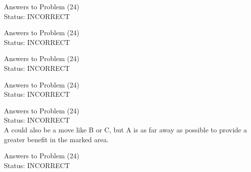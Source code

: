 \documentclass[11pt]{article}
\begin{document}
\begin{minipage}[t]{0.5\textwidth}
  {\centering
  
  Answers to Problem (24)\\
  Status: INCORRECT\\
  
  }
\end{minipage}
\begin{minipage}[t]{0.5\textwidth}
  {\centering
  
  Answers to Problem (24)\\
  Status: INCORRECT\\
  
  }
\end{minipage}
\begin{minipage}[t]{0.5\textwidth}
  {\centering
  
  Answers to Problem (24)\\
  Status: INCORRECT\\
  
  }
\end{minipage}
\begin{minipage}[t]{0.5\textwidth}
  {\centering
  
  Answers to Problem (24)\\
  Status: INCORRECT\\
  
  }
\end{minipage}
\begin{minipage}[t]{0.5\textwidth}
  {\centering
  
  Answers to Problem (24)\\
  Status: INCORRECT\\
  A could also be a move like B or C, but A is as far away as possible to provide a greater benefit in the marked area.\\
  }
\end{minipage}
\begin{minipage}[t]{0.5\textwidth}
  {\centering
  
  Answers to Problem (24)\\
  Status: INCORRECT\\
  
  }
\end{minipage}
\end{document}
